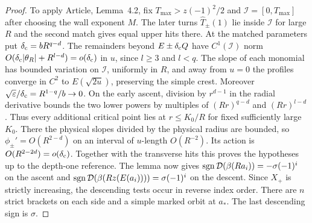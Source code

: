 \begin{proof}
To apply Article, Lemma~4.2, fix $T_{\max}>z(-1)^2/2$ and
$\mathcal I=[0,T_{\max}]$ after choosing the wall exponent $M$. The later
turns $\widehat T_\pm(1)$ lie inside $\mathcal I$ for large $R$ and the second
match gives equal upper hits there. At the matched parameters put
$\delta_{\rm c}=bR^{q-d}$. The remainders beyond
$E\pm\delta_{\rm c}Q$ have $C^1(\mathcal I)$ norm
$O(\delta_{\rm c}|\theta_R|+R^{l-d})=o(\delta_{\rm c})$ in $u$,
since $l\ge3$ and $l<q$. The slope of each monomial has bounded
variation on $\mathcal I$, uniformly in $R$, and away from $u=0$ the profiles
converge in $C^2$ to $E(\sqrt{2u})$, preserving the simple crest.
Moreover $\sqrt{\varepsilon}/\delta_{\rm c}=R^{1-q}/b\to0$.
On the early ascent, division by $r^{d-1}$ in the radial derivative
bounds the two lower powers by multiples of $(Rr)^{q-d}$ and
$(Rr)^{l-d}$. Thus every additional critical point lies at
$r\le K_0/R$ for fixed sufficiently large $K_0$.
There the physical slopes divided by the physical radius are bounded,
so $\phi_\pm'=O(R^{2-d})$ on an interval of $u$-length $O(R^{-2})$.
Its action is $O(R^{2-2d})=o(\delta_{\rm c})$.
Together with the transverse hits this proves the hypotheses up to
the depth-one reference. The lemma now gives
$\operatorname{sgn}\mathcal{D}(\beta(Ra_i))=-\sigma(-1)^i$ on the ascent and
$\operatorname{sgn}\mathcal{D}(\beta(Rz(E(a_i))))=\sigma(-1)^i$ on the descent.
Since $X_+$ is strictly increasing, the descending tests occur in
reverse index order. There are $n$ strict brackets on each side and
a simple marked orbit at $a_*$. The last descending sign is $\sigma$.


\end{proof}
